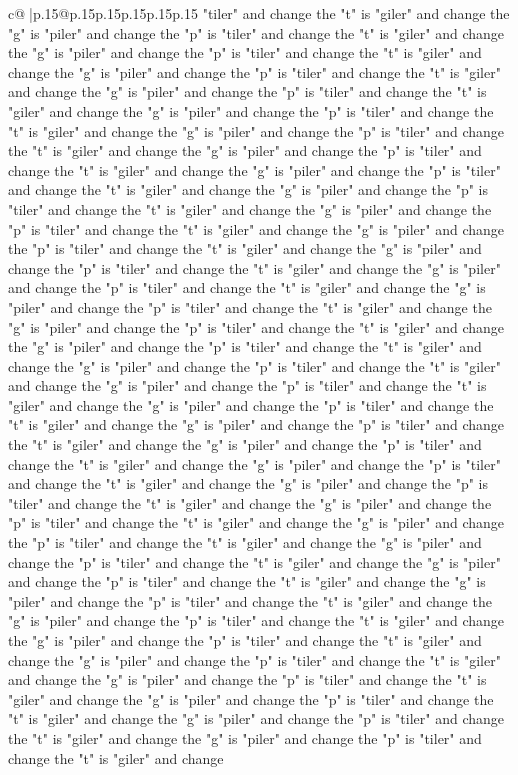 \documentclass{article}
\begin{document}
{\begin{supertabular}{c@{$\;$}|p{.15\linewidth}@{}p{.15\linewidth}p{.15\linewidth}p{.15\linewidth}p{.15\linewidth}p{.15\linewidth}}
{{{"tiler" and change the "t" is "giler" and change the "g" is "piler" and change the "p" is "tiler" and change the "t" is "giler" and change the "g" is "piler" and change the "p" is "tiler" and change the "t" is "giler" and change the "g" is "piler" and change the "p" is "tiler" and change the "t" is "giler" and change the "g" is "piler" and change the "p" is "tiler" and change the "t" is "giler" and change the "g" is "piler" and change the "p" is "tiler" and change the "t" is "giler" and change the "g" is "piler" and change the "p" is "tiler" and change the "t" is "giler" and change the "g" is "piler" and change the "p" is "tiler" and change the "t" is "giler" and change the "g" is "piler" and change the "p" is "tiler" and change the "t" is "giler" and change the "g" is "piler" and change the "p" is "tiler" and change the "t" is "giler" and change the "g" is "piler" and change the "p" is "tiler" and change the "t" is "giler" and change the "g" is "piler" and change the "p" is "tiler" and change the "t" is "giler" and change the "g" is "piler" and change the "p" is "tiler" and change the "t" is "giler" and change the "g" is "piler" and change the "p" is "tiler" and change the "t" is "giler" and change the "g" is "piler" and change the "p" is "tiler" and change the "t" is "giler" and change the "g" is "piler" and change the "p" is "tiler" and change the "t" is "giler" and change the "g" is "piler" and change the "p" is "tiler" and change the "t" is "giler" and change the "g" is "piler" and change the "p" is "tiler" and change the "t" is "giler" and change the "g" is "piler" and change the "p" is "tiler" and change the "t" is "giler" and change the "g" is "piler" and change the "p" is "tiler" and change the "t" is "giler" and change the "g" is "piler" and change the "p" is "tiler" and change the "t" is "giler" and change the "g" is "piler" and change the "p" is "tiler" and change the "t" is "giler" and change the "g" is "piler" and change the "p" is "tiler" and change the "t" is "giler" and change the "g" is "piler" and change the "p" is "tiler" and change the "t" is "giler" and change the "g" is "piler" and change the "p" is "tiler" and change the "t" is "giler" and change the "g" is "piler" and change the "p" is "tiler" and change the "t" is "giler" and change the "g" is "piler" and change the "p" is "tiler" and change the "t" is "giler" and change the "g" is "piler" and change the "p" is "tiler" and change the "t" is "giler" and change the "g" is "piler" and change the "p" is "tiler" and change the "t" is "giler" and change the "g" is "piler" and change the "p" is "tiler" and change the "t" is "giler" and change the "g" is "piler" and change the "p" is "tiler" and change the "t" is "giler" and change the "g" is "piler" and change the "p" is "tiler" and change the "t" is "giler" and change the "g" is "piler" and change the "p" is "tiler" and change the "t" is "giler" and change the "g" is "piler" and change the "p" is "tiler" and change the "t" is "giler" and change the "g" is "piler" and change the "p" is "tiler" and change the "t" is "giler" and change the "g" is "piler" and change the "p" is "tiler" and change the "t" is "giler" and change }}}
\end{supertabular}}
\end{document}
